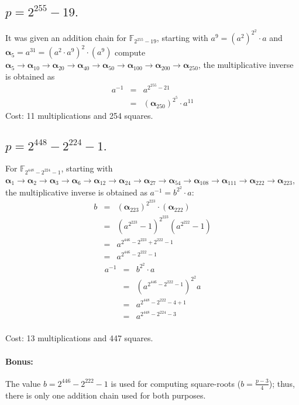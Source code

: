 \documentclass{article}
\begin{document}
\subsection{$p=2^{255}-19.$}

It was given an addition chain for $\mathbb{F}_{2^{255}-19}$, starting with $a^9=(a^2)^{2^2}\cdot a$ and $\bm{\alpha}_5=a^{31}=(a^2\cdot a^9)^2\cdot (a^9)$  compute   
$
\bm{\alpha}_{5} \rightarrow \bm{\alpha}_{10} \rightarrow \bm{\alpha}_{20} \rightarrow 
\bm{\alpha}_{40} \rightarrow \bm{\alpha}_{50} \rightarrow \bm{\alpha}_{100} \rightarrow 
\bm{\alpha}_{200} \rightarrow \bm{\alpha}_{250}
$, the multiplicative inverse is obtained as 
\begin{eqnarray*}
a^{-1} &=& a^{2^{255}-21} \\
       &=& (\bm{\alpha}_{250})^{2^5}\cdot a^{11}
\end{eqnarray*}
Cost: 11 multiplications and 254 squares.


\subsection{$p=2^{448}-2^{224}-1.$} For $\mathbb{F}_{2^{448}-2^{224}-1}$, starting with  
$
\bm{\alpha}_{1} \rightarrow   \bm{\alpha}_{2}  \rightarrow
\bm{\alpha}_{3}   \rightarrow \bm{\alpha}_{6}  \rightarrow \bm{\alpha}_{12} \rightarrow 
\bm{\alpha}_{24}  \rightarrow \bm{\alpha}_{27} \rightarrow \bm{\alpha}_{54} \rightarrow 
\bm{\alpha}_{108} \rightarrow \bm{\alpha}_{111}\rightarrow \bm{\alpha}_{222} \rightarrow 
\bm{\alpha}_{223}
$, the multiplicative inverse is obtained as $a^{-1} = b^{2^2}\cdot a$:
\begin{eqnarray*}
b &=& (\bm{\alpha}_{223})^{2^{223}}\cdot (\bm{\alpha}_{222})\\
  &=& (a^{2^{223}}-1)^{2^{223}} (a^{2^{222}}-1)\\
  &=& a^{2^{446}-2^{223}+2^{222}-1}\\
  &=& a^{2^{446}-2^{222}-1}
\end{eqnarray*}
\begin{eqnarray*}
a^{-1} &=& b^{2^2}\cdot a\\
	   &=& (a^{2^{446}-2^{222}-1})^{2^2}a\\
	   &=& a^{2^{448}-2^{222}-4+1}\\
       &=& a^{2^{448}-2^{224}-3}\\
\end{eqnarray*}

Cost: 13 multiplications and 447 squares.

\paragraph{Bonus:}  The value $b=2^{446}-2^{222}-1$ is used for computing square-roots ($b = \frac{p-3}{4}$); thus, there is only one addition chain used for both purposes.
\end{document}
